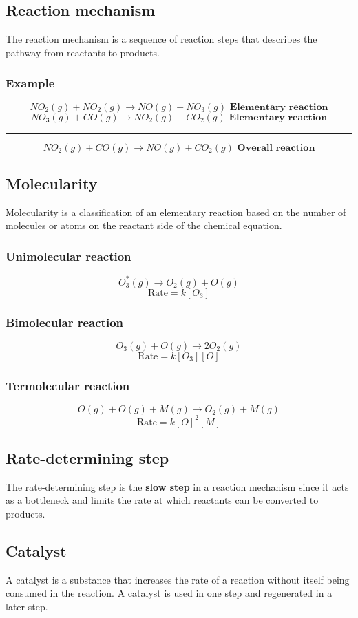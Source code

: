 \documentclass[11pt]{article}
\begin{document}
\subsection{Reaction mechanism}
\label{sec:org6f9ac67}
The reaction mechanism is a sequence of reaction steps that describes the pathway from reactants to products.
\subsubsection{Example}
\label{sec:org7418116}
\[NO_2 (g) + NO_2 (g) \rightarrow NO (g) + NO_3 (g) \textbf{ Elementary reaction}\]
\[NO_3 (g) + CO (g) \rightarrow NO_2 (g) + CO_2 (g) \textbf{ Elementary reaction}\]
\hrule
\[NO_2 (g) + CO (g) \rightarrow NO (g) + CO_2 (g) \textbf { Overall reaction}\]
\subsection{Molecularity}
\label{sec:orgfde9d66}
Molecularity is a classification of an elementary reaction based on the number of molecules or atoms on the reactant side of the chemical equation.
\subsubsection{Unimolecular reaction}
\label{sec:org5fad543}
\[O_3^* (g) \rightarrow O_2 (g) + O (g)\]
\[\text{Rate} = k[O_3]\]
\subsubsection{Bimolecular reaction}
\label{sec:org4e85d9c}
\[O_3 (g) + O (g) \rightarrow 2O_2 (g)\]
\[\text{Rate} = k[O_3][O]\]
\subsubsection{Termolecular reaction}
\label{sec:orgcdfb4ce}
\[O (g) + O (g) + M (g) \rightarrow O_2 (g) + M (g)\]
\[\text{Rate} = k[O]^2[M]\]
\subsection{Rate-determining step}
\label{sec:org8053ddb}
The rate-determining step is the \textbf{slow step} in a reaction mechanism since it acts as a bottleneck and limits the rate at which reactants can be converted to products.

\newpage
\subsection{Catalyst}
\label{sec:orge4d8fe3}
A catalyst is a substance that increases the rate of a reaction without itself being consumed in the reaction. A catalyst is used in one step and regenerated in a later step.
\end{document}
